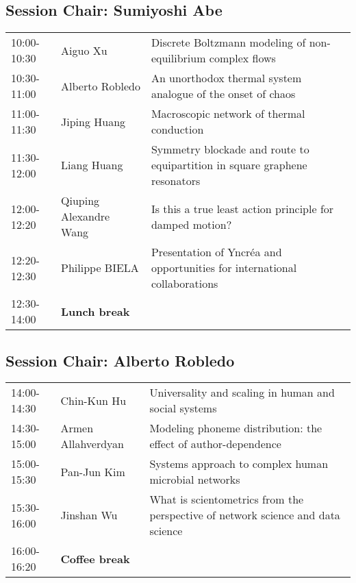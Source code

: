 \documentclass[oneside,A4paper,12pt]{article}
\begin{document}
\subsection*{Session \uppercase\expandafter{}  \hspace{10mm} Chair: Sumiyoshi Abe}
\label{sec:orgd63dfca}


\begin{center}
\begin{tabular}{p{2.5cm}p{4.5cm}p{7.5cm}}
\hline
10:00-10:30 & Aiguo Xu & Discrete Boltzmann modeling of non-equilibrium complex flows\\
10:30-11:00 & Alberto Robledo & An unorthodox thermal system analogue of the onset of chaos\\
11:00-11:30 & Jiping Huang & Macroscopic network of thermal conduction\\
11:30-12:00 & Liang Huang & Symmetry blockade and route to equipartition in square graphene resonators\\
12:00-12:20 & Qiuping Alexandre Wang & Is this a true least action principle for damped motion?\\
12:20-12:30 & Philippe BIELA & Presentation of Yncréa and opportunities for international collaborations\\
\cellcolor{blue!25}12:30-14:00 & \cellcolor{blue!25}\textbf{Lunch break} & \cellcolor{blue!25}\\
\hline
\end{tabular}
\end{center}

\newpage
\subsection*{Session \uppercase\expandafter{}  \hspace{10mm} Chair: Alberto Robledo}
\label{sec:org67de4e4}

\begin{center}
\begin{tabular}{p{2.5cm}p{4cm}p{8.5cm}}
\hline
14:00-14:30 & Chin-Kun Hu & Universality and scaling in human and social systems\\
14:30-15:00 & Armen Allahverdyan & Modeling phoneme distribution: the effect of author-dependence\\
15:00-15:30 & Pan-Jun Kim & Systems approach to complex human microbial networks\\
15:30-16:00 & Jinshan Wu & What is scientometrics from the perspective of network science and data science\\
\cellcolor{blue!25}16:00-16:20 & \cellcolor{blue!25}\textbf{Coffee break} & \cellcolor{blue!25}\\
\hline
\end{tabular}
\end{center}
\end{document}
